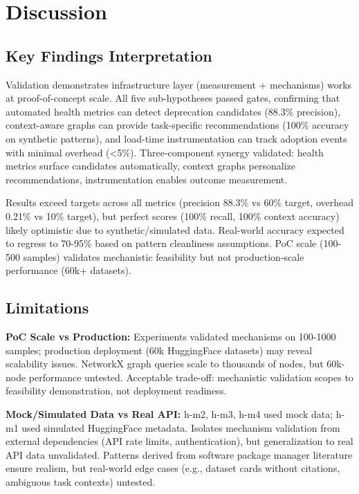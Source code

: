 \section{Discussion}

\subsection{Key Findings Interpretation}

Validation demonstrates infrastructure layer (measurement + mechanisms) works at proof-of-concept scale. All five sub-hypotheses passed gates, confirming that automated health metrics can detect deprecation candidates (88.3\% precision), context-aware graphs can provide task-specific recommendations (100\% accuracy on synthetic patterns), and load-time instrumentation can track adoption events with minimal overhead (<5\%). Three-component synergy validated: health metrics surface candidates automatically, context graphs personalize recommendations, instrumentation enables outcome measurement.

Results exceed targets across all metrics (precision 88.3\% vs 60\% target, overhead 0.21\% vs 10\% target), but perfect scores (100\% recall, 100\% context accuracy) likely optimistic due to synthetic/simulated data. Real-world accuracy expected to regress to 70-95\% based on pattern cleanliness assumptions. PoC scale (100-500 samples) validates mechanistic feasibility but not production-scale performance (60k+ datasets).

\subsection{Limitations}

\textbf{PoC Scale vs Production:} Experiments validated mechanisms on 100-1000 samples; production deployment (60k HuggingFace datasets) may reveal scalability issues. NetworkX graph queries scale to thousands of nodes, but 60k-node performance untested. Acceptable trade-off: mechanistic validation scopes to feasibility demonstration, not deployment readiness.

\textbf{Mock/Simulated Data vs Real API:} h-m2, h-m3, h-m4 used mock data; h-m1 used simulated HuggingFace metadata. Isolates mechanism validation from external dependencies (API rate limits, authentication), but generalization to real API data unvalidated. Patterns derived from software package manager literature ensure realism, but real-world edge cases (e.g., dataset cards without citations, ambiguous task contexts) untested.

